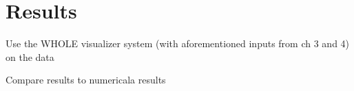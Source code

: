 
\chapter{Results\label{ch:usage}}

Use the WHOLE visualizer system (with aforementioned inputs from ch 3 and 4) on the data

Compare results to numericala results

 





